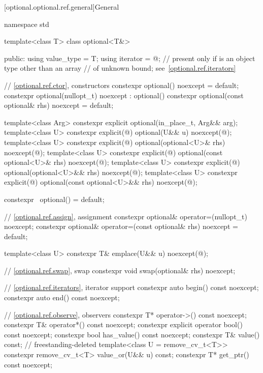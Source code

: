 [optional.optional.ref.general]{General}
\begin{codeblock}
namespace std {
  template<class T>
  class optional<T&> {
  public:
    using value_type = T;
    using iterator   = @\impdefnc@;  // present only if  is an object type other than an array
                                                // of unknown bound; see~\ref{optional.ref.iterators}

    // \ref{optional.ref.ctor}, constructors
    constexpr optional() noexcept = default;
    constexpr optional(nullopt_t) noexcept : optional() {}
    constexpr optional(const optional& rhs) noexcept = default;

    template<class Arg>
      constexpr explicit optional(in_place_t, Arg&& arg);
    template<class U>
      constexpr explicit(@\seebelow@) optional(U&& u) noexcept(@\seebelow@);
    template<class U>
      constexpr explicit(@\seebelow@) optional(optional<U>& rhs) noexcept(@\seebelow@);
    template<class U>
      constexpr explicit(@\seebelow@) optional(const optional<U>& rhs) noexcept(@\seebelow@);
    template<class U>
      constexpr explicit(@\seebelow@) optional(optional<U>&& rhs) noexcept(@\seebelow@);
    template<class U>
      constexpr explicit(@\seebelow@) optional(const optional<U>&& rhs) noexcept(@\seebelow@);

    constexpr ~optional() = default;

    // \ref{optional.ref.assign}, assignment
    constexpr optional& operator=(nullopt_t) noexcept;
    constexpr optional& operator=(const optional& rhs) noexcept = default;

    template<class U> constexpr T& emplace(U&& u) noexcept(@\seebelow@);

    // \ref{optional.ref.swap}, swap
    constexpr void swap(optional& rhs) noexcept;

    // \ref{optional.ref.iterators}, iterator support
    constexpr auto begin() const noexcept;
    constexpr auto end() const noexcept;

    // \ref{optional.ref.observe}, observers
    constexpr T*       operator->() const noexcept;
    constexpr T&       operator*() const noexcept;
    constexpr explicit operator bool() const noexcept;
    constexpr bool     has_value() const noexcept;
    constexpr T&       value() const;                           // freestanding-deleted
    template<class U = remove_cv_t<T>>
      constexpr remove_cv_t<T> value_or(U&& u) const;
    constexpr T* get_ptr() const noexcept;

}}
\end{codeblock}
